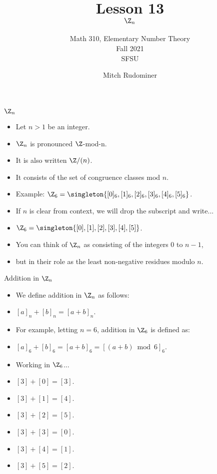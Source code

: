\documentclass[handout]{beamer}
\title{Lesson 13 \\ $\Z_n$}
\subtitle{Math 310, Elementary Number Theory \\ Fall 2021 \\ SFSU}
\author{Mitch Rudominer}
\date{}
\begin{document}
\begin{frame}
  \titlepage
\end{frame}

\begin{frame}{$\Z_n$}

\begin{itemize}
  \item Let $n>1$ be an integer.
  \item $\Z_n$ is pronounced $\Z$-mod-n.
  \item It is also written $\Z/(n)$.
  \item It consists of the  set of congruence classes mod $n$.
  \item Example: $\Z_6=\singleton{[0]_6,[1]_6,[2]_6,[3]_6,[4]_6,[5]_6}$.
  \item If $n$ is clear from context, we will drop the subscript and write...
  \item  $\Z_6=\singleton{[0],[1],[2],[3],[4],[5]}$.
  \item You can think of $\Z_n$ as consisting of the integers $0$ to $n-1$,
  \item but in their role as the least non-negative residues modulo $n$.
\end{itemize}
\end{frame}

\begin{frame}{Addition in $\Z_n$}

\begin{itemize}
  \item We define addition in $\Z_n$ as follows:
  \item $[a]_n + [b]_n = [a+b]_n$.
  \item For example, letting $n=6$, addition in $\Z_6$ is defined as:
  \item $[a]_6 + [b]_6 = [a+b]_6 = [(a+b) \bmod 6]_6$.
  \item Working in $\Z_6$...
  \item $[3] + [0] = [3]$.
  \item $[3] + [1] = [4]$.
  \item $[3] + [2] = [5]$.
  \item $[3] + [3] = [0]$.
  \item $[3] + [4] = [1]$.
  \item $[3] + [5] = [2]$.
\end{itemize}

\end{frame}
\end{document}
